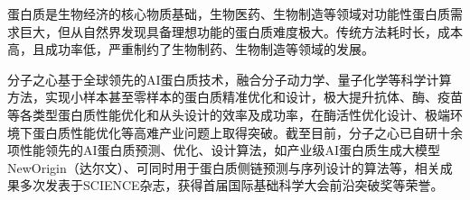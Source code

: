 蛋白质是生物经济的核心物质基础，生物医药、生物制造等领域对功能性蛋白质需求巨大，但从自然界发现具备理想功能的蛋白质难度极大。传统方法耗时长，成本高，且成功率低，严重制约了生物制药、生物制造等领域的发展。

分子之心基于全球领先的AI蛋白质技术，融合分子动力学、量子化学等科学计算方法，实现小样本甚至零样本的蛋白质精准优化和设计，极大提升抗体、酶、疫苗等各类型蛋白质性能优化和从头设计的效率及成功率，在酶活性优化设计、极端环境下蛋白质性能优化等高难产业问题上取得突破。截至目前，分子之心已自研十余项性能领先的AI蛋白质预测、优化、设计算法，如产业级AI蛋白质生成大模型NewOrigin（达尔文）、可同时用于蛋白质侧链预测与序列设计的算法等，相关成果多次发表于SCIENCE杂志，获得首届国际基础科学大会前沿突破奖等荣誉。